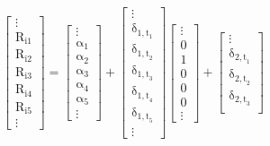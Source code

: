 \documentclass[11pt, english]{article}
\begin{document}
		$$\mathrm{
                \begin{bmatrix}
			\vdots\\
                        R_{i1}\\
                        R_{i2}\\
                        R_{i3}\\
                        R_{i4}\\
                        R_{i5}\\
                        \vdots
                \end{bmatrix}=
                \begin{bmatrix}
			\vdots\\
                        \alpha_1\\
                        \alpha_2\\
                        \alpha_3\\
                        \alpha_4\\
                        \alpha_5\\
                        \vdots
                \end{bmatrix}+
                \begin{bmatrix}
			\vdots\\
			\delta_{{1,t}_1}\\
			\delta_{{1,t}_2}\\
			\delta_{{1,t}_3}\\
			\delta_{{1,t}_4}\\
			\delta_{{1,t}_5}\\
                        \vdots
                \end{bmatrix}
                \begin{bmatrix}
                        \vdots\\
			0\\
                        1\\
                        0\\
                        0\\
                        0\\
                        \vdots
                \end{bmatrix}+
                \begin{bmatrix}
			\vdots\\
			\delta_{{2,t}_1}\\
			\delta_{{2,t}_2}\\
			\delta_{{2,t}_3}\\

\end{bmatrix}}$$
\end{document}
